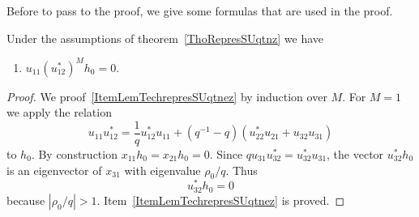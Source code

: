 Before to pass to the proof, we give some formulas that are used in the proof.
\begin{lemma}       \label{LemTechrepresSUqtnez}
	Under the assumptions of theorem~\ref{ThoRepresSUqtnz} we have
	\begin{enumerate}
		\item   \label{ItemLemTechrepresSUqtnez}
		      \( u_{11}(u_{12}^*)^Mh_0=0\).
	\end{enumerate}
\end{lemma}

\begin{proof}
	We proof~\ref{ItemLemTechrepresSUqtnez} by induction over \( M\). For \( M=1\) we apply the relation
	\begin{equation}
		u_{11}u_{12}^*=\frac{1}{ q }u_{12}^*u_{11}+(q^{-1}-q)(u_{22}^*u_{21}+u_{32}u_{31})
	\end{equation}
	to \( h_0\). By construction \( x_{11}h_0=x_{21}h_0=0\). Since \( qu_{31}u_{32}^*=u_{32}^*u_{31}\), the vector \( u_{32}^*h_0\) is an eigenvector of \( x_{31}\) with eigenvalue \( \rho_0/q\). Thus
	\begin{equation}
		u_{32}^*h_0=0
	\end{equation}
	because \( | \rho_0/q |>1\). Item~\ref{ItemLemTechrepresSUqtnez} is proved.

\end{proof}


